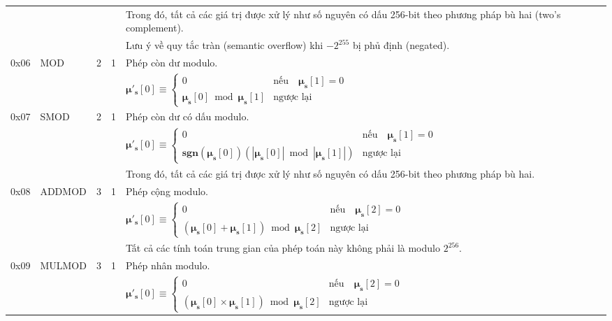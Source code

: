 \documentclass[9pt,oneside]{amsart}
\begin{document}
\begin{tabu}{r l r r l}
&&&& Trong đó, tất cả các giá trị được xử lý như số nguyên có dấu 256-bit theo phương pháp bù hai (two's complement). \\
&&&& Lưu ý về quy tắc tràn (semantic overflow) khi $-2^{255}$ bị phủ định (negated).\\
\midrule
0x06 & {\small MOD} & 2 & 1 & Phép còn dư modulo. \\
&&&& $\boldsymbol{\mu}'_{\mathbf{s}}[0] \equiv \begin{cases}0 & \text{nếu} \quad \boldsymbol{\mu}_{\mathbf{s}}[1] = 0\\ \boldsymbol{\mu}_{\mathbf{s}}[0] \bmod \boldsymbol{\mu}_{\mathbf{s}}[1] & \text{ngược lại}\end{cases}$  \\
\midrule
0x07 & {\small SMOD} & 2 & 1 & Phép còn dư có dấu modulo. \\
&&&& $\boldsymbol{\mu}'_{\mathbf{s}}[0] \equiv \begin{cases}0 & \text{nếu} \quad \boldsymbol{\mu}_{\mathbf{s}}[1] = 0\\ \mathbf{sgn} (\boldsymbol{\mu}_{\mathbf{s}}[0]) (|\boldsymbol{\mu}_{\mathbf{s}}[0]| \bmod |\boldsymbol{\mu}_{\mathbf{s}}[1]|) & \text{ngược lại}\end{cases}$  \\
&&&& Trong đó, tất cả các giá trị được xử lý như số nguyên có dấu 256-bit theo phương pháp bù hai. \\
\midrule
0x08 & {\small ADDMOD} & 3 & 1 & Phép cộng modulo. \\
&&&& $\boldsymbol{\mu}'_{\mathbf{s}}[0] \equiv \begin{cases}0 & \text{nếu} \quad \boldsymbol{\mu}_{\mathbf{s}}[2] = 0\\ (\boldsymbol{\mu}_{\mathbf{s}}[0] + \boldsymbol{\mu}_{\mathbf{s}}[1]) \bmod \boldsymbol{\mu}_{\mathbf{s}}[2] & \text{ngược lại}\end{cases}$  \\
&&&& Tất cả các tính toán trung gian của phép toán này không phải là modulo $2^{256}$. \\
\midrule
0x09 & {\small MULMOD} & 3 & 1 & Phép nhân modulo. \\
&&&& $\boldsymbol{\mu}'_{\mathbf{s}}[0] \equiv \begin{cases}0 & \text{nếu} \quad \boldsymbol{\mu}_{\mathbf{s}}[2] = 0\\ (\boldsymbol{\mu}_{\mathbf{s}}[0] \times \boldsymbol{\mu}_{\mathbf{s}}[1]) \bmod \boldsymbol{\mu}_{\mathbf{s}}[2] & \text{ngược lại}\end{cases}$  \\

\end{tabu}
\end{document}
